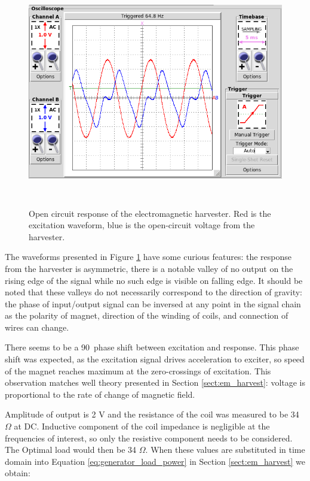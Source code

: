 \begin{figure}[htb]
\begin{center}
\includegraphics[height=10cm]{images/own_measurement/generator_shaker/inductive_td_open_65hz_dry.png}
\end{center}
\caption{\label{fig:inductive_65_open_dry} Open circuit response of the electromagnetic harvester. Red is the excitation waveform, blue is the open-circuit voltage from the harvester.}
\end{figure}

The waveforms presented in Figure \ref{fig:inductive_65_open_dry} have some curious features: the response from the harvester is asymmetric, there is a notable valley of no output on the rising edge of the signal while no such edge is visible on falling edge. It should be noted that these valleys do not necessarily correspond to the direction of gravity: the phase of input/output signal can be inversed at any point in the signal chain as the polarity of magnet, direction of the winding of coils, and connection of wires can change.

There seems to be a 90\degree \ phase shift between excitation and response. This phase shift was expected, as the excitation signal drives acceleration to exciter, so speed of the magnet reaches maximum at the zero-crossings of excitation. This observation matches well theory presented in Section \ref{sect:em_harvest}: voltage is proportional to the rate of change of magnetic field. 

Amplitude of output is 2 V and the resistance of the coil was measured to be 34 $\Omega$ at DC. Inductive component of the coil impedance is negligible at the frequencies of interest, so only the resistive component needs to be considered. The Optimal load would then be 34 $\Omega$. When these values are substituted in time domain into Equation \ref{eq:generator_load_power} in Section \ref{sect:em_harvest} we obtain:

